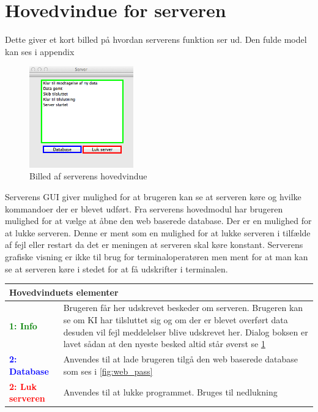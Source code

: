 \section*{Hovedvindue for serveren}
Dette giver et kort billed på hvordan serverens funktion ser ud. Den fulde model kan ses i appendix
\begin{figure}[htbp]
	\centering
	\includegraphics[width=0.4\textwidth]{billeder/server}
	\caption{Billed af serverens hovedvindue}
	\label{fig:server}
\end{figure}
Serverens GUI giver mulighed for at brugeren kan se at serveren køre og hvilke kommandoer der er blevet udført. Fra serverens hovedmodul har brugeren mulighed for at vælge at åbne den web baserede database. Der er en mulighed for at lukke serveren. Denne er ment som en mulighed for at lukke serveren i tilfælde af fejl eller restart da det er meningen at serveren skal køre konstant. Serverens grafiske visning er ikke til brug for terminaloperatøren men ment for at man kan se at serveren køre i stedet for at få udskrifter i terminalen.
\begin{table}[H]
\begin{tabular}{l p{12.5cm}}
\multicolumn{2}{l}{Hovedvinduets elementer} \\
\hline
\textcolor{green}{\textbf{1: Info}}
&Brugeren får her udskrevet beskeder om serveren. Brugeren kan se om KI har tilsluttet sig og om der er blevet overført data desuden vil fejl meddelelser blive udskrevet her. Dialog boksen er lavet sådan at den nyeste besked altid står øverst se \ref{fig:server}\\

\textcolor{blue}{\textbf{2: Database}}
&Anvendes til at lade brugeren tilgå den web baserede database som ses i \ref{fig:web_pass}\\

\textcolor{red}{\textbf{2: Luk serveren}}
&Anvendes til at lukke programmet. Bruges til nedlukning\\

\end{tabular}
\end{table}


